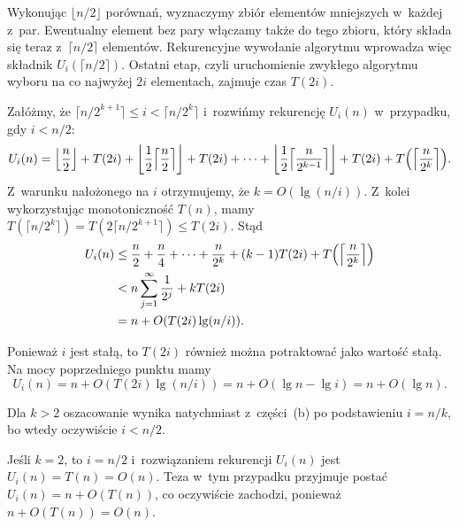 Wykonując $\lfloor n/2\rfloor$ porównań, wyznaczymy zbiór elementów mniejszych w~każdej z~par. Ewentualny element bez pary włączamy także do tego zbioru, który składa się teraz z~$\lceil n/2\rceil$ elementów. Rekurencyjne wywołanie algorytmu wprowadza więc składnik $U_i(\lceil n/2\rceil)$. Ostatni etap, czyli uruchomienie zwykłego algorytmu wyboru na co najwyżej $2i$ elementach, zajmuje czas $T(2i)$.

\subproblem %
Załóżmy, że $\lceil n/2^{k+1}\rceil\le i<\lceil n/2^k\rceil$ i~rozwińmy rekurencję $U_i(n)$ w~przypadku, gdy $i<n/2$:
\[
	U_i(n) = \Bigl\lfloor\frac{n}{2}\Bigr\rfloor+T(2i)+\biggl\lfloor\frac{1}{2}\Bigl\lceil\frac{n}{2}\Bigr\rceil\biggr\rfloor+T(2i)+\dots+\biggl\lfloor\frac{1}{2}\Bigl\lceil\frac{n}{2^{k-1}}\Bigr\rceil\biggr\rfloor+T(2i)+T\Bigl(\Bigl\lceil\frac{n}{2^k}\Bigr\rceil\Bigr).
\]
Z~warunku nałożonego na $i$ otrzymujemy, że $k=O(\lg(n/i))$. Z~kolei wykorzystując monotoniczność $T(n)$, mamy $T(\lceil n/2^k\rceil)=T(2\lceil n/2^{k+1}\rceil)\le T(2i)$. Stąd
\begin{align*}
	U_i(n) &\le \frac{n}{2}+\frac{n}{4}+\dots+\frac{n}{2^k}+(k-1)T(2i)+T\Bigl(\Bigl\lceil\frac{n}{2^k}\Bigr\rceil\Bigr) \\
	&< n\sum_{j=1}^\infty\frac{1}{2^j}+kT(2i) \\
	&= n+O(T(2i)\lg(n/i)).
\end{align*}

\subproblem %
Ponieważ $i$ jest stałą, to $T(2i)$ również można potraktować jako wartość stałą. Na mocy poprzedniego punktu mamy
\[
	U_i(n) = n+O(T(2i)\lg(n/i)) = n+O(\lg n-\lg i) = n+O(\lg n).
\]

\subproblem %
Dla $k>2$ oszacowanie wynika natychmiast z~części~(b) po podstawieniu $i=n/k$, bo wtedy oczywiście $i<n/2$.

Jeśli $k=2$, to $i=n/2$ i~rozwiązaniem rekurencji $U_i(n)$ jest $U_i(n)=T(n)=O(n)$. Teza w~tym przypadku przyjmuje postać $U_i(n)=n+O(T(n))$, co oczywiście zachodzi, ponieważ $n+O(T(n))=O(n)$.

\endinput
